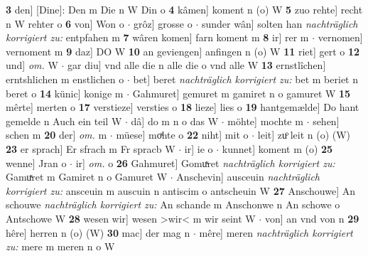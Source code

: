 \documentclass[8pt,a4paper,notitlepage]{article}
\begin{document}
\begin{table}[ht]
\begin{minipage}[t]{0.5\linewidth}
\textbf{3} den] [Dine]: Den m Die n W Din o \textbf{4} kâmen] koment n (o) W \textbf{5} zuo rehte] recht n W rehter o \textbf{6} von] Won o  $\cdot$ grôz] grosse o  $\cdot$ sunder wân] solten han \textit{nachträglich korrigiert zu:} entpfahen m \textbf{7} wâren komen] farn koment m \textbf{8} ir] rer m  $\cdot$ vernomen] vernoment m \textbf{9} daz] DO W \textbf{10} an geviengen] anfingen n (o) W \textbf{11} riet] gert o \textbf{12} und] \textit{om.} W  $\cdot$ gar diu] vnd alle die n alle die o vnd alle W \textbf{13} ernstlîchen] erntshlichen m enstlichen o  $\cdot$ bet] beret \textit{nachträglich korrigiert zu:} bet m beriet n beret o \textbf{14} künic] konige m  $\cdot$ Gahmuret] gemuret m gamiret n o gamuret W \textbf{15} mêrte] merten o \textbf{17} verstieze] versties o \textbf{18} lieze] lies o \textbf{19} hantgemælde] Do hant gemelde n Auch ein teil W  $\cdot$ dâ] do m n o das W  $\cdot$ möhte] mochte m  $\cdot$ sehen] schen m \textbf{20} der] \textit{om.} m  $\cdot$ müese] moͯhte o \textbf{22} niht] mit o  $\cdot$ leit] zuͦ leit n (o) (W) \textbf{23} er sprach] Er sfrach m Fr spracb W  $\cdot$ ir] ie o  $\cdot$ kunnet] koment m (o) \textbf{25} wenne] Jran o  $\cdot$ ir] \textit{om.} o \textbf{26} Gahmuret] Gomuͯret \textit{nachträglich korrigiert zu:} Gamuͯret m Gamiret n o Gamuret W  $\cdot$ Anschevin] ausceuin \textit{nachträglich korrigiert zu:} ansceuin m auscuin n antiscim o antscheuin W \textbf{27} Anschouwe] An schouwe \textit{nachträglich korrigiert zu:} An schande m Anschonwe n An schowe o Antschowe W \textbf{28} wesen wir] wesen >wir< m wir seint W  $\cdot$ von] an vnd von n \textbf{29} hêre] herren n (o) (W) \textbf{30} mac] der mag n  $\cdot$ mêre] meren \textit{nachträglich korrigiert zu:} mere m meren n o W \newline
\end{minipage}
\end{table}
\newpage
\end{document}
